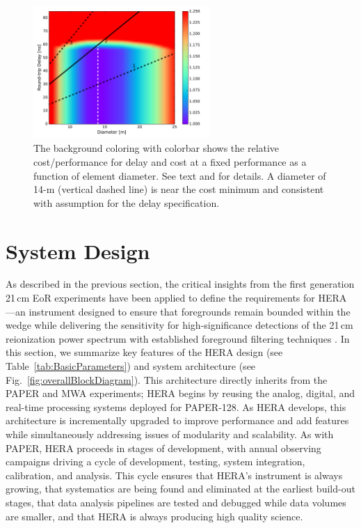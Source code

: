 \documentclass[preprint,11pt]{aastex}
\begin{document}
\begin{figure}[t]
\centerline{
\includegraphics[width=0.6\textwidth]{plots/costfig.pdf} 
}
\caption{\small The background coloring with colorbar shows the relative cost/performance for delay and cost at a fixed performance as a function of element diameter.  See text and \cite{elementmemo} for details.  A diameter of 14-m (vertical dashed line) is near the cost minimum and consistent with assumption for the delay specification.
\label{fig:costfig}}
\end{figure}

\section{System Design} \label{sec:design}
As described in the previous section, the critical insights from the first generation 21\,cm EoR experiments have been applied to define
the requirements for HERA---an instrument designed to ensure that foregrounds remain bounded
within the wedge while delivering the sensitivity for
high-significance detections of the 21\,cm reionization power spectrum with
established foreground filtering techniques
\citep{pober_et_al2014,greig_and_mesinger2015}.
In this section, we summarize key features of the HERA design (see Table~\ref{tab:BasicParameters}) 
and system architecture (see Fig.~\ref{fig:overallBlockDiagram}).
This architecture directly inherits from the PAPER and MWA experiments; HERA begins by reusing the
analog, digital, and real-time processing systems deployed for PAPER-128.  As HERA develops, this
architecture is incrementally upgraded to improve performance and add features while simultaneously
addressing issues of modularity and scalability.  As with PAPER, HERA proceeds in stages of development,
with annual observing campaigns driving a cycle of development, testing, system integration, calibration, and analysis.
This cycle ensures that HERA's instrument is always growing, that systematics are being found and eliminated at the
earliest build-out stages, that data analysis pipelines are tested and debugged while data volumes are smaller,
and that HERA is always producing high quality science.
\end{document}
